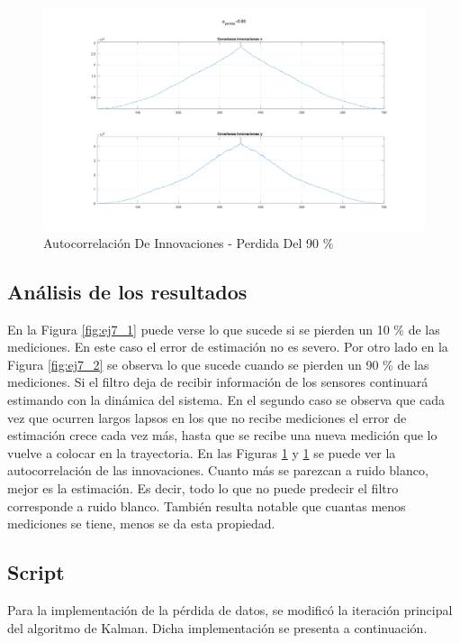 	\begin{figure}[H]
		\centering
		\includegraphics[scale=0.5,trim={6,5cm 0 0 0}]{Figuras/covinn_ej7_2.pdf}
		\caption{Autocorrelación De Innovaciones - Perdida Del 90 \%}
		\label{fig:ej7_1_inov}
	\end{figure}
	
	\subsection{Análisis de los resultados}

	En la Figura \ref{fig:ej7_1} puede verse lo que sucede si se pierden un 10 \% de las mediciones. En este caso el error de estimación no es severo. Por otro lado en la Figura \ref{fig:ej7_2} se observa lo que sucede cuando se pierden un 90 \% de las mediciones. Si el filtro deja de recibir información de los sensores continuará estimando con la dinámica del sistema. En el segundo caso se observa que cada vez que ocurren largos lapsos en los que no recibe mediciones el error de estimación crece cada vez más, hasta que se recibe una nueva medición que lo vuelve a colocar en la trayectoria.
	En las Figuras \ref{fig:ej7_1_inov} y \ref{fig:ej7_1_inov} se puede ver la autocorrelación de las innovaciones. Cuanto más se parezcan a ruido blanco, mejor es la estimación. Es decir, todo lo que no puede predecir el filtro corresponde a ruido blanco. También resulta notable que cuantas menos mediciones se tiene, menos se da esta propiedad.
	


	\subsection{Script}

	Para la implementación de la pérdida de datos, se modificó la iteración principal del algoritmo de Kalman. Dicha implementación se presenta a continuación.\\	
	
